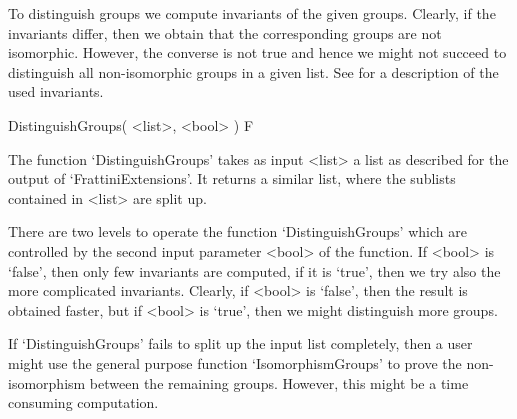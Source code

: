 To distinguish groups we compute invariants of the given groups. 
Clearly, if the invariants differ, then we obtain that the corresponding
groups are not isomorphic. However, the converse is not true and hence
we might not succeed to distinguish all non-isomorphic groups in a 
given list. See \cite{BE99} for a description of the used invariants.

\> DistinguishGroups( <list>, <bool> ) F

The function `DistinguishGroups' takes as input <list> a list as 
described for the output of `FrattiniExtensions'. It returns a similar 
list, where the sublists contained in <list> are split up.

There are two levels to operate the function `DistinguishGroups' which 
are controlled by the second input parameter <bool> of the function. 
If <bool> is `false', then only few invariants are computed, if it is 
`true', then we try also the more complicated invariants.
Clearly, if <bool> is `false', then the result is obtained faster,
but if <bool> is `true', then we might distinguish more groups.

If `DistinguishGroups' fails to split up the input list completely,
then a user might use the general purpose function `IsomorphismGroups'
to prove the non-isomorphism between the remaining groups. However,
this might be a time consuming computation.
